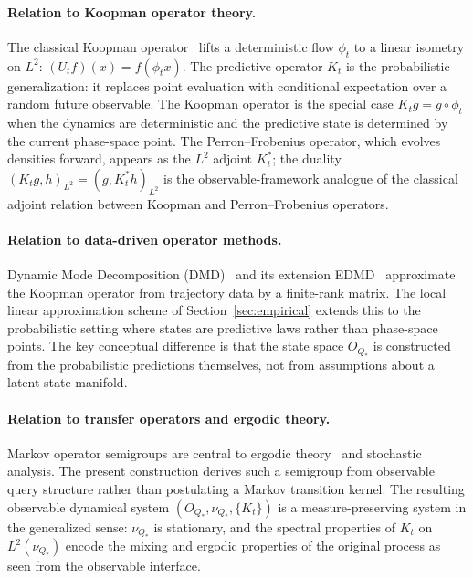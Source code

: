 \paragraph{Relation to Koopman operator theory.}
The classical Koopman operator~\cite{Koopman1931} lifts a deterministic
flow $\phi_t$ to a linear isometry on $L^2$: $(U_t f)(x) = f(\phi_t x)$.
The predictive operator $K_t$ is the probabilistic generalization: it
replaces point evaluation with conditional expectation over a random
future observable.  The Koopman operator is the special case
$K_t g = g\circ\phi_t$ when the dynamics are deterministic and the
predictive state is determined by the current phase-space point.  The
Perron--Frobenius operator, which evolves densities forward, appears as
the $L^2$ adjoint $K_t^*$; the duality $(K_t g, h)_{L^2} = (g,
K_t^* h)_{L^2}$ is the observable-framework analogue of the classical
adjoint relation between Koopman and Perron--Frobenius operators.

\paragraph{Relation to data-driven operator methods.}
Dynamic Mode Decomposition (DMD)~\cite{Schmid2010,Mezic} and its extension
EDMD~\cite{Williams2015} approximate the Koopman operator from trajectory data by a
finite-rank matrix.  The local linear approximation scheme of
Section~\ref{sec:empirical} extends this to the probabilistic setting
where states are predictive laws rather than phase-space points.
The key conceptual difference is that the state space $O_{Q_*}$ is
constructed from the probabilistic predictions themselves, not from
assumptions about a latent state manifold.

\paragraph{Relation to transfer operators and ergodic theory.}
Markov operator semigroups are central to ergodic theory~\cite{Kallenberg}
and stochastic analysis.  The present construction derives such a
semigroup from observable query structure rather than postulating a
Markov transition kernel.  The resulting observable dynamical system
$(O_{Q_*},\nu_{Q_*},\{K_t\})$ is a measure-preserving system in the
generalized sense: $\nu_{Q_*}$ is stationary, and the spectral
properties of $K_t$ on $L^2(\nu_{Q_*})$ encode the mixing and
ergodic properties of the original process as seen from the observable
interface.

